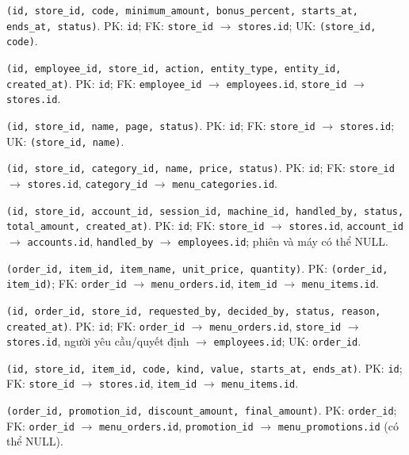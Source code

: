 \begin{description}[leftmargin=4.2cm,labelwidth=4.0cm,style=nextline]
  \item[\texttt{promotions}] \texttt{(id, store\_id, code, minimum\_amount, bonus\_percent, starts\_at, ends\_at, status)}. PK: \texttt{id}; FK: \texttt{store\_id} $\rightarrow$ \texttt{stores.id}; UK: \texttt{(store\_id, code)}.
  \item[\texttt{management\_audit}] \texttt{(id, employee\_id, store\_id, action, entity\_type, entity\_id, created\_at)}. PK: \texttt{id}; FK: \texttt{employee\_id} $\rightarrow$ \texttt{employees.id}, \texttt{store\_id} $\rightarrow$ \texttt{stores.id}.
  \item[\texttt{menu\_categories}] \texttt{(id, store\_id, name, page, status)}. PK: \texttt{id}; FK: \texttt{store\_id} $\rightarrow$ \texttt{stores.id}; UK: \texttt{(store\_id, name)}.
  \item[\texttt{menu\_items}] \texttt{(id, store\_id, category\_id, name, price, status)}. PK: \texttt{id}; FK: \texttt{store\_id} $\rightarrow$ \texttt{stores.id}, \texttt{category\_id} $\rightarrow$ \texttt{menu\_categories.id}.
  \item[\texttt{menu\_orders}] \texttt{(id, store\_id, account\_id, session\_id, machine\_id, handled\_by, status, total\_amount, created\_at)}. PK: \texttt{id}; FK: \texttt{store\_id} $\rightarrow$ \texttt{stores.id}, \texttt{account\_id} $\rightarrow$ \texttt{accounts.id}, \texttt{handled\_by} $\rightarrow$ \texttt{employees.id}; phiên và máy có thể NULL.
  \item[\texttt{menu\_order\_items}] \texttt{(order\_id, item\_id, item\_name, unit\_price, quantity)}. PK: \texttt{(order\_id, item\_id)}; FK: \texttt{order\_id} $\rightarrow$ \texttt{menu\_orders.id}, \texttt{item\_id} $\rightarrow$ \texttt{menu\_items.id}.
  \item[\texttt{pos\_order\_reversals}] \texttt{(id, order\_id, store\_id, requested\_by, decided\_by, status, reason, created\_at)}. PK: \texttt{id}; FK: \texttt{order\_id} $\rightarrow$ \texttt{menu\_orders.id}, \texttt{store\_id} $\rightarrow$ \texttt{stores.id}, người yêu cầu/quyết định $\rightarrow$ \texttt{employees.id}; UK: \texttt{order\_id}.
  \item[\texttt{menu\_promotions}] \texttt{(id, store\_id, item\_id, code, kind, value, starts\_at, ends\_at)}. PK: \texttt{id}; FK: \texttt{store\_id} $\rightarrow$ \texttt{stores.id}, \texttt{item\_id} $\rightarrow$ \texttt{menu\_items.id}.
  \item[\texttt{menu\_order\_pricing}] \texttt{(order\_id, promotion\_id, discount\_amount, final\_amount)}. PK: \texttt{order\_id}; FK: \texttt{order\_id} $\rightarrow$ \texttt{menu\_orders.id}, \texttt{promotion\_id} $\rightarrow$ \texttt{menu\_promotions.id} (có thể NULL).

\end{description}
